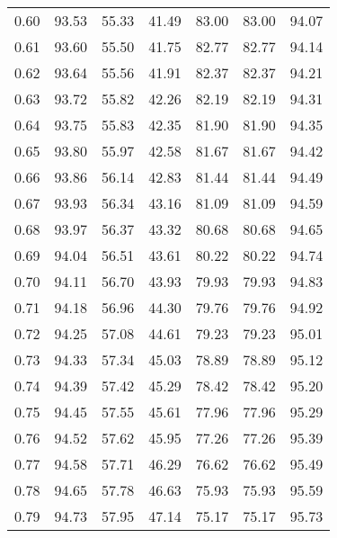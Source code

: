 \begin{tabular}{|c|c|c|c|c|c|c|}
      0.60 &     93.53 &     55.33 &      41.49 &   83.00 &      83.00 &         94.07 \\
      0.61 &     93.60 &     55.50 &      41.75 &   82.77 &      82.77 &         94.14 \\
      0.62 &     93.64 &     55.56 &      41.91 &   82.37 &      82.37 &         94.21 \\
      0.63 &     93.72 &     55.82 &      42.26 &   82.19 &      82.19 &         94.31 \\
      0.64 &     93.75 &     55.83 &      42.35 &   81.90 &      81.90 &         94.35 \\
      0.65 &     93.80 &     55.97 &      42.58 &   81.67 &      81.67 &         94.42 \\
      0.66 &     93.86 &     56.14 &      42.83 &   81.44 &      81.44 &         94.49 \\
      0.67 &     93.93 &     56.34 &      43.16 &   81.09 &      81.09 &         94.59 \\
      0.68 &     93.97 &     56.37 &      43.32 &   80.68 &      80.68 &         94.65 \\
      0.69 &     94.04 &     56.51 &      43.61 &   80.22 &      80.22 &         94.74 \\
      0.70 &     94.11 &     56.70 &      43.93 &   79.93 &      79.93 &         94.83 \\
      0.71 &     94.18 &     56.96 &      44.30 &   79.76 &      79.76 &         94.92 \\
      0.72 &     94.25 &     57.08 &      44.61 &   79.23 &      79.23 &         95.01 \\
      0.73 &     94.33 &     57.34 &      45.03 &   78.89 &      78.89 &         95.12 \\
      0.74 &     94.39 &     57.42 &      45.29 &   78.42 &      78.42 &         95.20 \\
      0.75 &     94.45 &     57.55 &      45.61 &   77.96 &      77.96 &         95.29 \\
      0.76 &     94.52 &     57.62 &      45.95 &   77.26 &      77.26 &         95.39 \\
      0.77 &     94.58 &     57.71 &      46.29 &   76.62 &      76.62 &         95.49 \\
      0.78 &     94.65 &     57.78 &      46.63 &   75.93 &      75.93 &         95.59 \\
      0.79 &     94.73 &     57.95 &      47.14 &   75.17 &      75.17 &         95.73 \\

\end{tabular}
